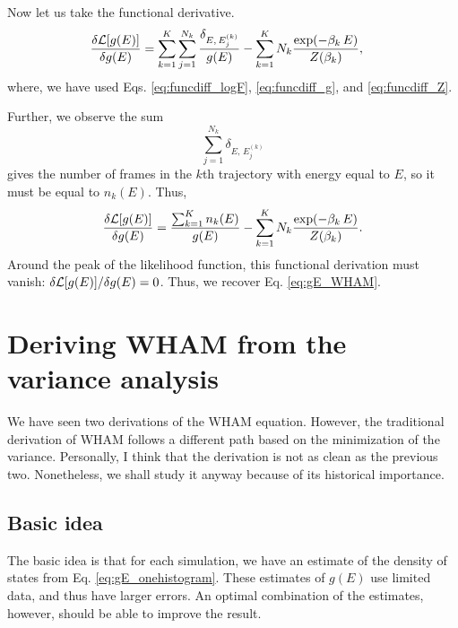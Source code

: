 \documentclass[aip,jcp,preprint,superscriptaddress]{revtex4-1}
\begin{document}
Now let us take the functional derivative.
%
\begin{align}
\frac{ \delta \mathcal{L}[g(E)] }
     { \delta g(E) }
&=
\sum_{k = 1}^K
\sum_{j = 1}^{N_k}
\frac{ \delta_{E, \, E^{(k)}_j} }
     { g( E ) }
-
\sum_{k = 1}^K
N_k
\frac{ \exp(-\beta_k \, E) }
     { Z(\beta_k) },
\end{align}
where,
we have used Eqs.
\eqref{eq:funcdiff_logF},
\eqref{eq:funcdiff_g},
and
\eqref{eq:funcdiff_Z}.




Further,
we observe the sum
\[
  \sum_{j = 1}^{N_k} \delta_{E, \, E^{(k)}_j}
\]
gives the number of frames in the $k$th trajectory
with energy equal to $E$,
so it must be equal to $n_k(E)$.
%
Thus,
\begin{align}
\frac{ \delta \mathcal{L}[g(E)] }
     { \delta g(E) }
=
\frac{  \sum_{k = 1}^K n_k(E) }
     { g( E ) }
-
\sum_{k = 1}^K
N_k
\frac{ \exp(-\beta_k \, E) }
     { Z(\beta_k) }.
\end{align}
%
Around the peak of the likelihood function,
this functional derivation must vanish:
$\delta \mathcal{L}[g(E)]/ \delta g(E) = 0$.
%
Thus,
we recover Eq. \eqref{eq:gE_WHAM}.




\section{\label{sec:WHAM_var}
Deriving WHAM from the variance analysis}




We have seen two derivations of the WHAM equation.
%
However, the traditional derivation of WHAM\cite{
ferrenberg1988, *ferrenberg1989, kumar1992,
newman, frenkel}
follows a different path
based on the minimization of the variance.
%
Personally,
I think that the derivation
is not as clean as the previous two.
%
Nonetheless,
we shall study it anyway
because of its historical importance.



\subsection{Basic idea}


The basic idea is that
for each simulation,
we have an estimate of the density of states
from Eq. \eqref{eq:gE_onehistogram}.
%
These estimates of $g(E)$
use limited data, and thus have larger errors.
%
An optimal combination of the estimates, however,
should be able to improve the result.
\end{document}
